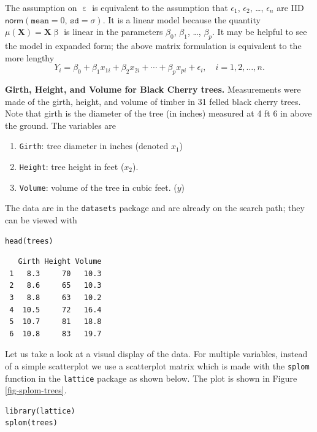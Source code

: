 \documentclass[captions=tableheading]{scrbook}
\begin{document}
The assumption on \(\upepsilon\) is equivalent to the assumption that \(\epsilon_{1}\), \(\epsilon_{2}\), \ldots{}, \(\epsilon_{n}\) are IID \(\mathsf{norm}(\mathtt{mean}=0,\,\mathtt{sd}=\sigma)\). It is a linear model because the quantity \(\mu(\mathbf{X})=\mathbf{X}\upbeta\) is linear in the parameters \(\beta_{0}\), \(\beta_{1}\), \ldots{}, \(\beta_{p}\). It may be helpful to see the model in expanded form; the above matrix formulation is equivalent to the more lengthy
\begin{equation} 
Y_{i}=\beta_{0}+\beta_{1}x_{1i}+\beta_{2}x_{2i}+\cdots+\beta_{p}x_{pi}+\epsilon_{i},\quad i=1,2,\ldots,n.
\end{equation}

\begin{example}
\textbf{Girth, Height, and Volume for Black Cherry trees.} 
Measurements were made of the girth, height, and volume of timber in 31 felled black cherry trees. Note that girth is the diameter of the tree (in inches) measured at 4 ft 6 in above the ground. The variables are

\begin{enumerate}
\item \texttt{Girth}: tree diameter in inches (denoted \(x_{1}\))
\item \texttt{Height}: tree height in feet (\(x_{2}\)).
\item \texttt{Volume}: volume of the tree in cubic feet. (\(y\))
\end{enumerate}

The data are in the \texttt{datasets} package and are already on the search path; they can be viewed with


\begin{verbatim}
head(trees)
\end{verbatim}

\begin{verbatim}
   Girth Height Volume
 1   8.3     70   10.3
 2   8.6     65   10.3
 3   8.8     63   10.2
 4  10.5     72   16.4
 5  10.7     81   18.8
 6  10.8     83   19.7
\end{verbatim}

Let us take a look at a visual display of the data. For multiple variables, instead of a simple scatterplot we use a scatterplot matrix which is made with the \texttt{splom} function in the \texttt{lattice} package \cite{Sarkarlattice} as shown below. The plot is shown in Figure \ref{fig-splom-trees}.


\begin{verbatim}
library(lattice)
splom(trees)
\end{verbatim}






\end{example}
\end{document}
